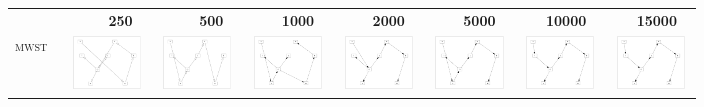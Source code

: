 \begin{table}[!p]
\vspace*{-\baselineskip}
\hspace*{-5mm}
\begin{tabular}{r@{}p{2.0cm}@{}p{2.0cm}@{}p{2.0cm}@{}p{2.0cm}@{}p{2.0cm}@{}p{2.0cm}@{}p{2.0cm}}
 & \textbf{~~~~~250} & \textbf{~~~~~500} & \textbf{~~~~1000} & \textbf{~~~~2000} & \textbf{~~~~5000} & \textbf{~~~10000} & \textbf{~~~15000} \\
\textsc{mwst~} &
\includegraphics[width=20.3mm, height=14.25mm]{fig/11-Sep-2003-14-42-00-dag-asia250-MSWT-RES} &
\includegraphics[width=20.3mm, height=14.25mm]{fig/11-Aug-2003-13-48-14-dag-asia500-MSWT-RES} &
\includegraphics[width=20.3mm, height=14.25mm]{fig/19-Feb-2003-16-04-58-dag-asia1000-MSWT-RES} &
\includegraphics[width=20.3mm, height=14.25mm]{fig/19-Feb-2003-16-04-58-dag-asia2000-MSWT-RES} &
\includegraphics[width=20.3mm, height=14.25mm]{fig/19-Feb-2003-16-04-58-dag-asia5000-MSWT-RES} &
\includegraphics[width=20.3mm, height=14.25mm]{fig/19-Feb-2003-16-04-58-dag-asia10000-MSWT-RES} &
\includegraphics[width=20.3mm, height=14.25mm]{fig/19-Feb-2003-16-04-58-dag-asia15000-MSWT-RES} \\

\end{tabular}
\end{table}
